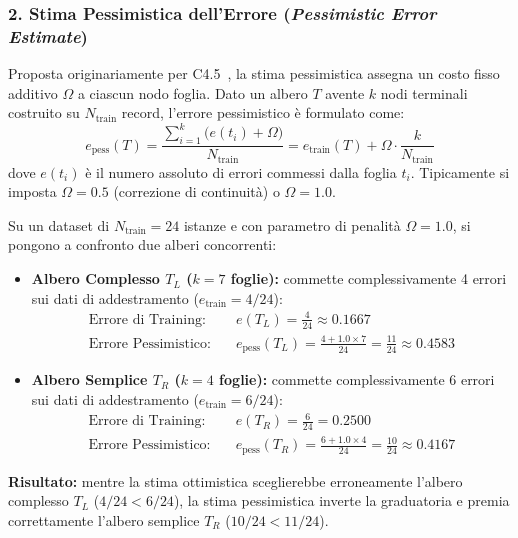 \subsubsection{2. Stima Pessimistica dell'Errore (\textit{Pessimistic Error Estimate})}
Proposta originariamente per C4.5~\cite{quinlan1993}, la stima pessimistica assegna un costo fisso additivo $\Omega$ a ciascun nodo foglia.
Dato un albero $T$ avente $k$ nodi terminali costruito su $N_{\text{train}}$ record, l'errore pessimistico è formulato come:
\begin{equation}
    e_{\text{pess}}(T) = \frac{\sum_{i=1}^k \big( e(t_i) + \Omega \big)}{N_{\text{train}}} = e_{\text{train}}(T) + \Omega \cdot \frac{k}{N_{\text{train}}}
\end{equation}
dove $e(t_i)$ è il numero assoluto di errori commessi dalla foglia $t_i$. Tipicamente si imposta $\Omega = 0.5$ (correzione di continuità) o $\Omega = 1.0$.

\begin{example}
Su un dataset di $N_{\text{train}} = 24$ istanze e con parametro di penalità $\Omega = 1.0$, si pongono a confronto due alberi concorrenti:
\begin{itemize}
    \item \textbf{Albero Complesso $T_L$ ($k = 7$ foglie):} commette complessivamente 4 errori sui dati di addestramento ($e_{\text{train}} = 4/24$):
    \begin{align}
        \text{Errore di Training:} & \quad e(T_L) = \frac{4}{24} \approx 0.1667 \\
        \text{Errore Pessimistico:} & \quad e_{\text{pess}}(T_L) = \frac{4 + 1.0 \times 7}{24} = \frac{11}{24} \approx 0.4583
    \end{align}
    \item \textbf{Albero Semplice $T_R$ ($k = 4$ foglie):} commette complessivamente 6 errori sui dati di addestramento ($e_{\text{train}} = 6/24$):
    \begin{align}
        \text{Errore di Training:} & \quad e(T_R) = \frac{6}{24} = 0.2500 \\
        \text{Errore Pessimistico:} & \quad e_{\text{pess}}(T_R) = \frac{6 + 1.0 \times 4}{24} = \frac{10}{24} \approx 0.4167
    \end{align}
\end{itemize}
\textbf{Risultato:} mentre la stima ottimistica sceglierebbe erroneamente l'albero complesso $T_L$ ($4/24 < 6/24$), la stima pessimistica inverte la graduatoria e premia correttamente l'albero semplice $T_R$ ($10/24 < 11/24$).
\end{example}

